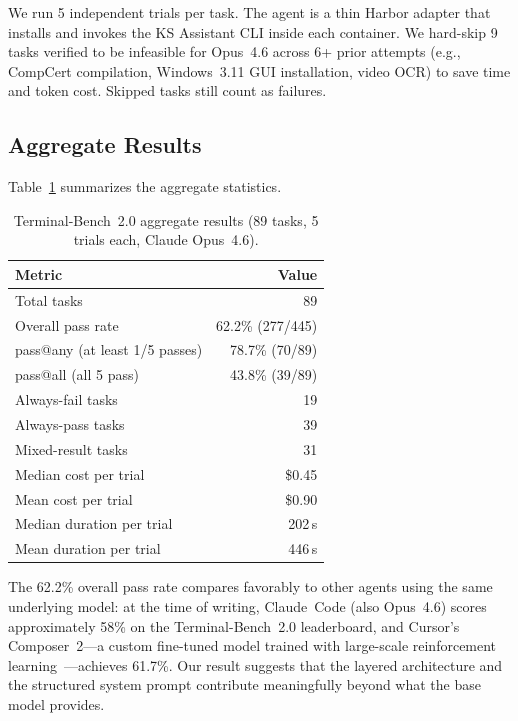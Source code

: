 \documentclass{article}
\begin{document}
We run 5 independent trials per task.  The agent is a thin Harbor adapter that installs and invokes the KS Assistant CLI inside each container.  We hard-skip 9 tasks verified to be infeasible for Opus~4.6 across 6+ prior attempts (e.g., CompCert compilation, Windows~3.11 GUI installation, video OCR) to save time and token cost.  Skipped tasks still count as failures.

\subsection{Aggregate Results}

Table~\ref{tab:tb2-aggregate} summarizes the aggregate statistics.

\begin{table}[h]
\centering
\caption{Terminal-Bench~2.0 aggregate results (89 tasks, 5 trials each, Claude Opus~4.6).}
\label{tab:tb2-aggregate}
\begin{tabular}{lr}
\toprule
\textbf{Metric} & \textbf{Value} \\
\midrule
Total tasks              & 89 \\
Overall pass rate        & 62.2\% (277/445) \\
pass@any (at least 1/5 passes) & 78.7\% (70/89) \\
pass@all (all 5 pass)    & 43.8\% (39/89) \\
Always-fail tasks        & 19 \\
Always-pass tasks        & 39 \\
Mixed-result tasks       & 31 \\
Median cost per trial    & \$0.45 \\
Mean cost per trial      & \$0.90 \\
Median duration per trial & 202\,s \\
Mean duration per trial  & 446\,s \\
\bottomrule
\end{tabular}
\end{table}

The 62.2\% overall pass rate compares favorably to other agents using the same underlying model: at the time of writing, Claude~Code (also Opus~4.6) scores approximately 58\% on the Terminal-Bench~2.0 leaderboard, and Cursor's Composer~2---a custom fine-tuned model trained with large-scale reinforcement learning~\citep{cursor2026composer2}---achieves 61.7\%.  Our result suggests that the layered architecture and the structured system prompt contribute meaningfully beyond what the base model provides.
\end{document}
